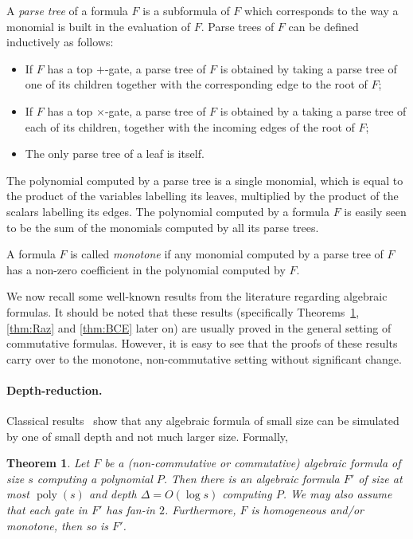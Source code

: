 \documentclass[11pt,a4paper]{article}
\newtheorem{theorem}{Theorem}
\newcommand{\poly}{\mathop{\mathrm{poly}}}
\begin{document}
A \emph{parse tree} of a formula $F$ is a subformula of $F$ which corresponds to the way a monomial is built in the evaluation of $F$.
Parse trees of $F$ can be defined inductively as follows:
\begin{itemize}
\item If $F$ has a top $+$-gate,
a parse tree of $F$ is obtained by taking a parse tree of one of its children together with the corresponding edge to the root of $F$;
\item If $F$ has a top $\times$-gate,
a parse tree of $F$ is obtained by a taking a parse tree of each of its children, together with the incoming edges of the root of $F$;
\item The only parse tree of a leaf is itself.
\end{itemize}
The polynomial computed by a parse tree is a single monomial, which
is equal to the product of the variables labelling its leaves, multiplied
by the product of the scalars labelling its edges.
The polynomial computed by a formula $F$ is easily seen to be the sum of the monomials computed by all its parse trees.

A formula $F$ is called \emph{monotone} if any monomial computed by a parse tree of $F$ has a non-zero coefficient
in the polynomial computed by $F$. 


We now recall some well-known results from the literature regarding algebraic formulas. It should be noted that these results (specifically Theorems~\ref{thm:standardDR}, \ref{thm:Raz} and \ref{thm:BCE} later on) are usually proved in the general setting of commutative formulas. However, it is easy to see that the proofs of these results carry over to the monotone, non-commutative setting without significant change.

\paragraph{Depth-reduction.} Classical results~\cite{BKM,Brent} show that any algebraic formula of small size can be simulated by one of small depth and not much larger size. Formally, 


\begin{theorem}
\label{thm:standardDR}
 Let $F$ be a (non-commutative or commutative) algebraic formula of size $s$ computing a polynomial $P$. Then there is an algebraic formula $F'$ of size at most $\poly(s)$ and depth $\Delta = O(\log s)$ computing $P$. We may also assume that each gate in $F'$ has fan-in $2$. Furthermore, $F$ is homogeneous and/or monotone, then so is $F'$.
\end{theorem}
\end{document}
